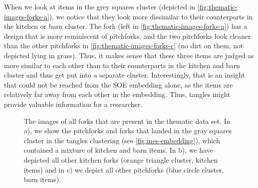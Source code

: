 When we look at items in the grey squares cluster (depicted in \autoref{fig:thematic-images-forks-a}), we notice that they look more dissimilar to their
counterparts in the kitchen or barn cluster. The fork (left in \autoref{fig:thematic-images-forks-a}) has a design that is more reminiscent of pitchforks, and the two pitchforks
look cleaner than the other pitchforks in \autoref{fig:thematic-images-forks-c} (no dirt on them, not depicted lying in grass). Thus, it makes sense that these three items are judged
as more similar to each other than to their counterparts in the kitchen and barn cluster and thus get put into a separate cluster. 
Interestingly, that is an insight that could not be reached from the SOE embedding alone, as the items are relatively far away from each other in the embedding. Thus, tangles might provide valuable information for a researcher. 

\begin{figure}[h]
    \centering
    \hfill
    \hfill
    \caption{
        The images of all forks that are present in the thematic data set. In a), we show the pitchforks and forks that landed in
        the gray squares cluster in the tangles clustering (see \autoref{fig:ines-embedding}), which contained a mixture of kitchen and barn items.
        In b), we have depicted all other kitchen forks (orange triangle cluster, kitchen items) and in c) we depict all other pitchforks 
        (blue circle cluster, barn items).
    }
    \label{fig:thematic-images-forks}
\end{figure}

